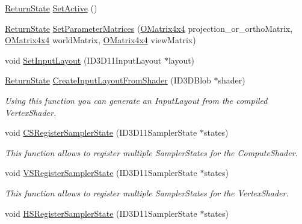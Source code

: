 \begin{DoxyCompactItemize}
\item 
\hyperlink{namespace_osiris_i_a8f53bf938dc75c65c6a529694514013e}{Return\-State} \hyperlink{class_osiris_i_1_1_graphics_1_1_shader_1_1_d_x11_shader_a1805b3cb0de70b4184de51667d6ceee7}{Set\-Active} ()
\item 
\hyperlink{namespace_osiris_i_a8f53bf938dc75c65c6a529694514013e}{Return\-State} \hyperlink{class_osiris_i_1_1_graphics_1_1_shader_1_1_d_x11_shader_af3ed086a80c2f44b2ff668a19fd5b625}{Set\-Parameter\-Matrices} (\hyperlink{struct_osiris_i_1_1_o_matrix4x4}{O\-Matrix4x4} projection\-\_\-or\-\_\-ortho\-Matrix, \hyperlink{struct_osiris_i_1_1_o_matrix4x4}{O\-Matrix4x4} world\-Matrix, \hyperlink{struct_osiris_i_1_1_o_matrix4x4}{O\-Matrix4x4} view\-Matrix)
\item 
void \hyperlink{class_osiris_i_1_1_graphics_1_1_shader_1_1_d_x11_shader_adb8a501938d1bce846cf06ad05cd951c}{Set\-Input\-Layout} (I\-D3\-D11\-Input\-Layout $\ast$layout)
\item 
\hyperlink{namespace_osiris_i_a8f53bf938dc75c65c6a529694514013e}{Return\-State} \hyperlink{class_osiris_i_1_1_graphics_1_1_shader_1_1_d_x11_shader_a1cffa0a4e683c89e02cb7d21ea2621ea}{Create\-Input\-Layout\-From\-Shader} (I\-D3\-D\-Blob $\ast$shader)
\begin{DoxyCompactList}\small\item\em Using this function you can generate an Input\-Layout from the compiled Vertex\-Shader. \end{DoxyCompactList}\item 
void \hyperlink{class_osiris_i_1_1_graphics_1_1_shader_1_1_d_x11_shader_aaf870f053649151c868c7f547c68e5f6}{C\-S\-Register\-Sampler\-State} (I\-D3\-D11\-Sampler\-State $\ast$states)
\begin{DoxyCompactList}\small\item\em This function allows to register multiple Sampler\-States for the Compute\-Shader. \end{DoxyCompactList}\item 
void \hyperlink{class_osiris_i_1_1_graphics_1_1_shader_1_1_d_x11_shader_a47c87f540216c5dab5cf4222514e79ec}{V\-S\-Register\-Sampler\-State} (I\-D3\-D11\-Sampler\-State $\ast$states)
\begin{DoxyCompactList}\small\item\em This function allows to register multiple Sampler\-States for the Vertex\-Shader. \end{DoxyCompactList}\item 
void \hyperlink{class_osiris_i_1_1_graphics_1_1_shader_1_1_d_x11_shader_a1c0c740b6deabc7c63dac8aab0f01c63}{H\-S\-Register\-Sampler\-State} (I\-D3\-D11\-Sampler\-State $\ast$states)

\end{DoxyCompactItemize}
